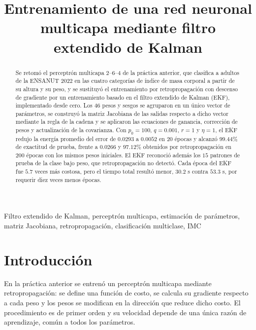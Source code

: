 \documentclass[conference]{IEEEtran}
\begin{document}
\title{Entrenamiento de una red neuronal multicapa mediante filtro extendido de Kalman}

\author{
}

\maketitle

\begin{abstract}
    Se retomó el perceptrón multicapa 2--6--4 de la práctica anterior, que
    clasifica a adultos de la ENSANUT 2022 en las cuatro categorías de índice
    de masa corporal a partir de su altura y su peso, y se sustituyó el
    entrenamiento por retropropagación con descenso de gradiente por un
    entrenamiento basado en el filtro extendido de Kalman (EKF),
    implementado desde cero. Los $46$ pesos y sesgos se agruparon en un único
    vector de parámetros, se construyó la matriz Jacobiana de las salidas
    respecto a dicho vector mediante la regla de la cadena y se aplicaron las
    ecuaciones de ganancia, corrección de pesos y actualización de la
    covarianza. Con $p_0=100$, $q=0.001$, $r=1$ y $\eta=1$, el EKF redujo la
    energía promedio del error de $0.0293$ a $0.0052$ en $20$ épocas y alcanzó
    $99.44\%$ de exactitud de prueba, frente a $0.0266$ y $97.12\%$ obtenidos
    por retropropagación en $200$ épocas con los mismos pesos iniciales. El
    EKF reconoció además los $15$ patrones de prueba de la clase bajo peso,
    que retropropagación no detectó. Cada época del EKF fue $5.7$ veces más
    costosa, pero el tiempo total resultó menor, $30.2$ s contra $53.3$ s,
    por requerir diez veces menos épocas.
\end{abstract}

\begin{IEEEkeywords}
Filtro extendido de Kalman, perceptrón multicapa, estimación de parámetros, matriz Jacobiana, retropropagación, clasificación multiclase, IMC
\end{IEEEkeywords}

\section{Introducción}
En la práctica anterior se entrenó un perceptrón multicapa mediante
retropropagación: se define una función de costo, se calcula su gradiente
respecto a cada peso y los pesos se modifican en la dirección que reduce
dicho costo. El procedimiento es de primer orden y su velocidad depende de
una única razón de aprendizaje, común a todos los parámetros.
\end{document}

